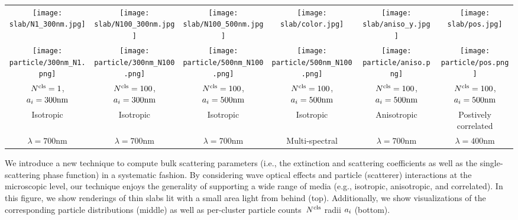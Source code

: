\begin{teaserfigure}
    \centering
    \setlength{\resLen}{1.12in}
    \addtolength{\tabcolsep}{-3.5pt}
    \small
    \begin{tabular}{cccccc}
        \texttt{[image: slab/N1\_300nm.jpg]} &
        \texttt{[image: slab/N100\_300nm.jpg]} &
        \texttt{[image: slab/N100\_500nm.jpg]} &
        \texttt{[image: slab/color.jpg]} & 
        \texttt{[image: slab/aniso\_y.jpg]} &
        \texttt{[image: slab/pos.jpg]}
        \\
        \texttt{[image: particle/300nm\_N1.png]} &
        \texttt{[image: particle/300nm\_N100.png]} &
        \texttt{[image: particle/500nm\_N100.png]} &
        \texttt{[image: particle/500nm\_N100.png]} &
        \texttt{[image: particle/aniso.png]} &
        \texttt{[image: particle/pos.png]}
        \\
        ${N^\text{cls}}=1$, $a_i=300\text{nm}$ &
        ${N^\text{cls}}=100$, $a_i=300\text{nm}$ &
        ${N^\text{cls}}=100$, $a_i=500\text{nm}$ &
        ${N^\text{cls}}=100$, $a_i=500\text{nm}$ & 
        ${N^\text{cls}}=100$, $a_i=500\text{nm}$ &
        ${N^\text{cls}}=100$, $a_i=500\text{nm}$
        \\
        Isotropic & Isotropic & Isotropic & Isotropic & Anisotropic & Postively correlated
        \\
        $\lambda=700\text{nm}$ &
        $\lambda=700\text{nm}$ &
        $\lambda=700\text{nm}$ &
        Multi-spectral &
        $\lambda=700\text{nm}$ &
        $\lambda=400\text{nm}$
    \end{tabular}
    \caption{\label{fig:teaser}
        We introduce a new technique to compute bulk scattering parameters (i.e., the extinction and scattering coefficients as well as the single-scattering phase function) in a systematic fashion. By considering wave optical effects and particle (scatterer) interactions at the microscopic level, our technique enjoys the generality of supporting a wide range of media (e.g., isotropic, anisotropic, and correlated).
        In this figure, we show renderings of thin slabs lit with a small area light from behind (top).
        Additionally, we show visualizations of the corresponding particle distributions (middle) as well as per-cluster particle counts~${N^\text{cls}}$ radii $a_i$ (bottom).
    }
\end{teaserfigure}
